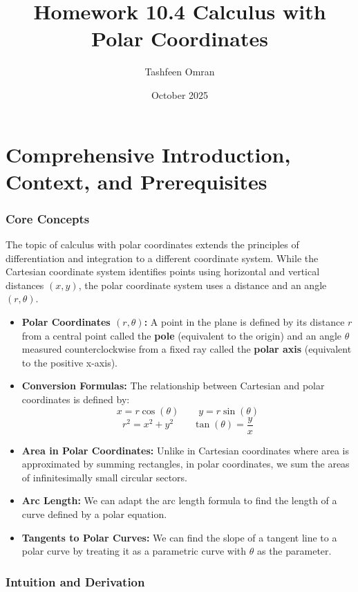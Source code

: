 \documentclass{article}
\title{Homework 10.4 Calculus with Polar Coordinates}
\author{Tashfeen Omran}
\date{October 2025}
\begin{document}
\maketitle

\part{Comprehensive Introduction, Context, and Prerequisites}

\section{Core Concepts}
The topic of calculus with polar coordinates extends the principles of differentiation and integration to a different coordinate system. While the Cartesian coordinate system identifies points using horizontal and vertical distances $(x, y)$, the polar coordinate system uses a distance and an angle $(r, \theta)$.

\begin{itemize}
    \item \textbf{Polar Coordinates $(r, \theta)$:} A point in the plane is defined by its distance $r$ from a central point called the \textbf{pole} (equivalent to the origin) and an angle $\theta$ measured counterclockwise from a fixed ray called the \textbf{polar axis} (equivalent to the positive x-axis).
    \item \textbf{Conversion Formulas:} The relationship between Cartesian and polar coordinates is defined by:
    \[ x = r \cos(\theta) \quad \quad y = r \sin(\theta) \]
    \[ r^2 = x^2 + y^2 \quad \quad \tan(\theta) = \frac{y}{x} \]
    \item \textbf{Area in Polar Coordinates:} Unlike in Cartesian coordinates where area is approximated by summing rectangles, in polar coordinates, we sum the areas of infinitesimally small circular sectors.
    \item \textbf{Arc Length:} We can adapt the arc length formula to find the length of a curve defined by a polar equation.
    \item \textbf{Tangents to Polar Curves:} We can find the slope of a tangent line to a polar curve by treating it as a parametric curve with $\theta$ as the parameter.
\end{itemize}

\section{Intuition and Derivation}
\end{document}
